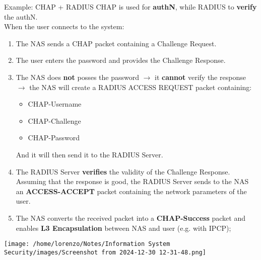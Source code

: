 \begin{center}
\begin{quotebox-grey}{Example: CHAP + RADIUS}
CHAP is used for \textbf{authN}, while RADIUS to \textbf{verify} the authN.\\
When the user connects to the system:
\begin{enumerate}
    \item The NAS sends a CHAP packet containing a Challenge Request.
    \item The user enters the password and provides the Challenge Response.
    \item The NAS does \textbf{not} posses the password \(\rightarrow \) it \textbf{cannot} verify the response \(\rightarrow \) the NAS will create a RADIUS ACCESS REQUEST packet containing:
    \begin{itemize}
        \item CHAP-Username
        \item CHAP-Challenge
        \item CHAP-Password
    \end{itemize}
    And it will then send it to the RADIUS Server.
    \item The RADIUS Server \textbf{verifies} the validity of the Challenge Response. Assuming that the
    response is good, the RADIUS Server sends to the NAS an \textbf{ACCESS-ACCEPT} packet containing the network parameters of the user.
    \item The NAS converts the received packet into a \textbf{CHAP-Success} packet and enables \textbf{L3
    Encapsulation} between NAS and user (e.g. with IPCP);
\end{enumerate}
    \vspace{0.2cm}
    \centering
    \texttt{[image: /home/lorenzo/Notes/Information System Security/images/Screenshot from 2024-12-30 12-31-48.png]}
\end{quotebox-grey}
\end{center}
\newpage
